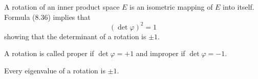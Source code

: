 A rotation of an inner product space $E$ is an isometric mapping of $E$ into itself. Formula (8.36) implies that
$$\left( \det \varphi \right)^2 = 1$$
showing that the determinant of a rotation is $\pm 1$.

A rotation is called proper if $\det \varphi = +1$ and improper if $\det \varphi = -1$.

Every eigenvalue of a rotation is $\pm 1$.
